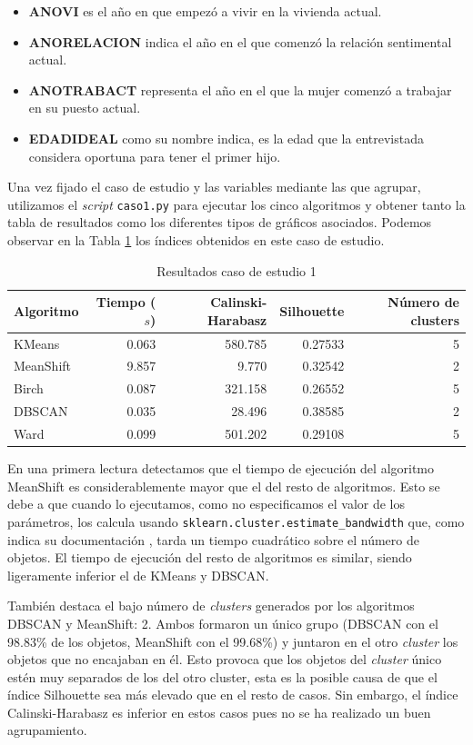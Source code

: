 \documentclass[a4paper, 20pt]{article}
\begin{document}
\begin{itemize}
\item \textbf{ANOVI} es el año en que empezó a vivir en la vivienda actual.
\item \textbf{ANORELACION} indica el año en el que comenzó la relación sentimental actual.
\item \textbf{ANOTRABACT} representa el año en el que la mujer comenzó a trabajar en su puesto actual.
\item \textbf{EDADIDEAL} como su nombre indica, es la edad que la entrevistada considera oportuna para tener el primer hijo.
\end{itemize}

Una vez fijado el caso de estudio y las variables mediante las que agrupar, utilizamos el \textit{script} \texttt{caso1.py} para ejecutar los cinco algoritmos y obtener tanto la tabla de resultados como los diferentes tipos de gráficos asociados. Podemos observar en la Tabla \ref{tab:algorithms1} los índices obtenidos en este caso de estudio.

\begin{table}[H]
\centering
\caption{Resultados caso de estudio 1}
\label{tab:algorithms1}
\begin{tabular}{lrrrr}
\toprule
Algoritmo & Tiempo ($s$) & Calinski-Harabasz & Silhouette & Número de clusters\\
\midrule
KMeans & 0.063 & 580.785 & 0.27533 & 5 \\
MeanShift & 9.857 & 9.770 & 0.32542 & 2 \\
Birch & 0.087 & 321.158 & 0.26552 & 5 \\
DBSCAN & 0.035 & 28.496 & 0.38585 & 2 \\
Ward & 0.099 & 501.202 & 0.29108 & 5 \\
\bottomrule
\end{tabular}
\end{table}

En una primera lectura detectamos que el tiempo de ejecución del algoritmo MeanShift es considerablemente mayor que el del resto de algoritmos. Esto se debe a que cuando lo ejecutamos, como no especificamos el valor de los parámetros, los calcula usando \texttt{sklearn.cluster.estimate\_bandwidth} que, como indica su documentación \cite{bandwidth}, tarda un tiempo cuadrático sobre el número de objetos. El tiempo de ejecución del resto de algoritmos es similar, siendo ligeramente inferior el de KMeans y DBSCAN.

También destaca el bajo número de \textit{clusters} generados por los algoritmos DBSCAN y MeanShift: 2. Ambos formaron un único grupo (DBSCAN con el 98.83\% de los objetos, MeanShift con el 99.68\%) y juntaron en el otro \textit{cluster} los objetos que no encajaban en él. Esto provoca que los objetos del \textit{cluster} único estén muy separados de los del otro cluster, esta es la posible causa de que el índice Silhouette sea más elevado que en el resto de casos. Sin embargo, el índice Calinski-Harabasz es inferior en estos casos pues no se ha realizado un buen agrupamiento.
\end{document}
